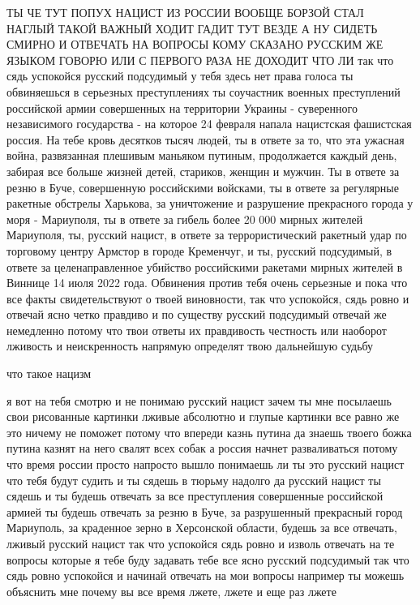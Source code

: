 ТЫ ЧЕ ТУТ ПОПУХ НАЦИСТ ИЗ РОССИИ ВООБЩЕ БОРЗОЙ СТАЛ НАГЛЫЙ ТАКОЙ ВАЖНЫЙ ХОДИТ
ГАДИТ ТУТ ВЕЗДЕ А НУ СИДЕТЬ СМИРНО И ОТВЕЧАТЬ НА ВОПРОСЫ КОМУ СКАЗАНО РУССКИМ
ЖЕ ЯЗЫКОМ ГОВОРЮ ИЛИ С ПЕРВОГО РАЗА НЕ ДОХОДИТ ЧТО ЛИ так что сядь успокойся
русский подсудимый у тебя здесь нет права голоса ты обвиняешься в серьезных
преступлениях ты соучастник военных преступлений российской армии совершенных
на территории Украины - суверенного независимого государства - на которое 24
февраля напала нацистская фашистская россия. На тебе кровь десятков тысяч
людей, ты в ответе за то, что эта ужасная война, развязанная плешивым маньяком
путиным, продолжается каждый день, забирая все больше жизней детей, стариков,
женщин и мужчин.  Ты в ответе за резню в Буче, совершенную российскими
войсками, ты в ответе за регулярные ракетные обстрелы Харькова, за уничтожение
и разрушение прекрасного города у моря - Мариуполя, ты в ответе за гибель более
20 000 мирных жителей Мариуполя, ты, русский нацист, в ответе за
террористический ракетный удар по торговому центру Армстор в городе Кременчуг,
и ты, русский подсудимый, в ответе за целенаправленное убийство российскими
ракетами мирных жителей в Виннице 14 июля 2022 года. Обвинения против тебя
очень серьезные и пока что все факты свидетельствуют о твоей виновности, так
что успокойся, сядь ровно и отвечай ясно четко правдиво и по существу русский
подсудимый отвечай же немедленно потому что твои ответы их правдивость честность или наоборот
лживость и неискренность напрямую определят твою дальнейшую судьбу

что такое нацизм

я вот на тебя смотрю и не понимаю русский нацист зачем ты мне посылаешь свои
рисованные картинки лживые абсолютно и глупые картинки все равно же это ничему
не поможет потому что впереди казнь путина да знаешь твоего божка путина казнят
на него свалят всех собак а россия начнет разваливаться потому что время россии
просто напросто вышло понимаешь ли ты это русский нацист что тебя будут судить
и ты сядешь в тюрьму надолго да русский нацист ты сядешь и ты будешь отвечать
за все преступления совершенные российской армией ты будешь отвечать за резню в
Буче, за разрушенный прекрасный город Мариуполь, за краденное зерно в
Херсонской области, будешь за все отвечать, лживый русский нацист так что
успокойся сядь ровно и изволь отвечать на те вопросы которые я тебе буду
задавать тебе все ясно русский подсудимый так что сядь ровно успокойся и
начинай отвечать на мои вопросы например ты можешь объяснить мне почему вы все
время лжете, лжете и еще раз лжете

